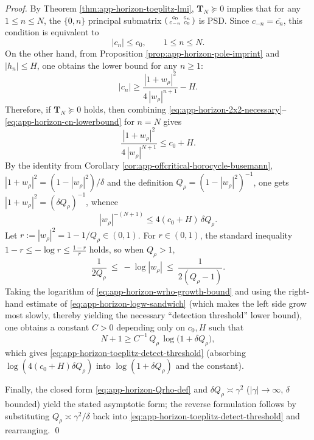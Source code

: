 \begin{proof}
By Theorem \ref{thm:app-horizon-toeplitz-lmi}, \(\mathbf{T}_N\succeq 0\) implies that for any \(1\le n\le N\), the \(\{0,n\}\) principal submatrix
\(
\begin{psmallmatrix}
c_0 & c_n\\
c_{-n} & c_0
\end{psmallmatrix}
\)
is PSD.
Since \(c_{-n}=\overline{c_n}\), this condition is equivalent to
\begin{equation}\label{eq:app-horizon-2x2-necessary}
|c_n|\le c_0,\qquad 1\le n\le N.
\end{equation}
On the other hand, from Proposition \ref{prop:app-horizon-pole-imprint} and \(|h_n|\le H\), one obtains the lower bound for any \(n\ge 1\):
\begin{equation}\label{eq:app-horizon-cn-lowerbound}
|c_n|
\ge
\frac{|1+w_\rho|^2}{4\,|w_\rho|^{n+1}}-H.
\end{equation}
Therefore, if \(\mathbf{T}_N\succeq 0\) holds, then combining \eqref{eq:app-horizon-2x2-necessary}--\eqref{eq:app-horizon-cn-lowerbound} for \(n=N\) gives
\[
\frac{|1+w_\rho|^2}{4\,|w_\rho|^{N+1}}\le c_0+H.
\]
By the identity from Corollary \ref{cor:app-offcritical-horocycle-busemann},
\(
|1+w_\rho|^2=(1-|w_\rho|^2)/\delta
\)
and the definition \(Q_\rho=(1-|w_\rho|^2)^{-1}\), one gets \(|1+w_\rho|^2=(\delta Q_\rho)^{-1}\), whence
\begin{equation}\label{eq:app-horizon-wrho-growth-bound}
|w_\rho|^{-(N+1)}\le 4(c_0+H)\,\delta Q_\rho.
\end{equation}
Let \(r:=|w_\rho|^2=1-1/Q_\rho\in(0,1)\).
For \(r\in(0,1)\), the standard inequality
\(
1-r\le -\log r \le \frac{1-r}{r}
\)
holds, so when \(Q_\rho>1\),
\begin{equation}\label{eq:app-horizon-logw-sandwich}
\frac{1}{2Q_\rho}\ \le\ -\log|w_\rho|\ \le\ \frac{1}{2(Q_\rho-1)}.
\end{equation}
Taking the logarithm of \eqref{eq:app-horizon-wrho-growth-bound} and using the right-hand estimate of \eqref{eq:app-horizon-logw-sandwich} (which makes the left side grow most slowly, thereby yielding the necessary ``detection threshold'' lower bound), one obtains a constant \(C>0\) depending only on \(c_0,H\) such that
\[
N+1
\ge
C^{-1}\,Q_\rho\,\log\!\bigl(1+\delta Q_\rho\bigr),
\]
which gives \eqref{eq:app-horizon-toeplitz-detect-threshold} (absorbing \(\log(4(c_0+H)\delta Q_\rho)\) into \(\log(1+\delta Q_\rho)\) and the constant).
\par
Finally, the closed form \eqref{eq:app-horizon-Qrho-def} and \(\delta Q_\rho\asymp \gamma^2\) (\(|\gamma|\to\infty\), \(\delta\) bounded) yield the stated asymptotic form; the reverse formulation follows by substituting \(Q_\rho\asymp \gamma^2/\delta\) back into \eqref{eq:app-horizon-toeplitz-detect-threshold} and rearranging. \qed
\end{proof}

